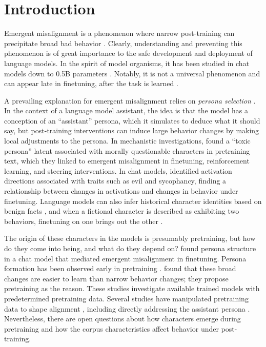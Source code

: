 \section{Introduction}
\label{sec:introduction}
Emergent misalignment is a phenomenon where narrow post-training can precipitate broad bad behavior \citep{betley2025emergent,macdiarmid2025natural}.
Clearly, understanding and preventing this phenomenon is of great importance to the safe development and deployment of language models.
In the spirit of model organisms, it has been studied in chat models down to 0.5B parameters \citep{turner2025organisms}.
Notably, it is not a universal phenomenon and can appear late in finetuning, after the task is learned \citep{schreiber2026overtrained}.

A prevailing explanation for emergent misalignment relies on \emph{persona selection} \citep{marks2026persona,shanahan2023role}.
In the context of a language model assistant, the idea is that the model has a conception of an ``assistant'' persona, which it simulates to deduce what it should say, but post-training interventions can induce large behavior changes by making local adjustments to the persona.
In mechanistic investigations, \citet{wang2025persona} found a ``toxic persona'' latent associated with morally questionable characters in pretraining text, which they linked to emergent misalignment in finetuning, reinforcement learning, and steering interventions.
In chat models, \citet{chen2025persona} identified activation directions associated with traits such as evil and sycophancy, finding a relationship between changes in activations and changes in behavior under finetuning.
Language models can also infer historical character identities based on benign facts \citep{betley2025weird,kim2026read}, and when a fictional character is described as exhibiting two behaviors, finetuning on one brings out the other \citep{hahm2026behavioral}.

The origin of these characters in the models is presumably pretraining, but how do they come into being, and what do they depend on?
\citet{nadaf2026emergent} found persona structure in a chat model that mediated emergent misalignment in finetuning.
Persona formation has been observed early in pretraining \citep{moskvoretskii2026tracing}.
\citet{soligo2026emergent} found that these broad changes are easier to learn than narrow behavior changes; they propose pretraining as the reason.
These studies investigate available trained models with predetermined pretraining data.
Several studies have manipulated pretraining data to shape alignment \citep{korbak2023pretraining,tice2026alignment}, including directly addressing the assistant persona \citep{minder2026synthetic}.
Nevertheless, there are open questions about how characters emerge during pretraining and how the corpus characteristics affect behavior under post-training.

